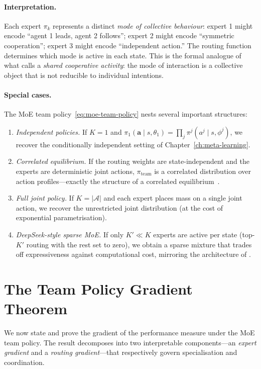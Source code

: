 \paragraph{Interpretation.} Each expert $\pi_k$ represents a distinct \emph{mode of collective behaviour}: expert 1 might encode ``agent 1 leads, agent 2 follows''; expert 2 might encode ``symmetric cooperation''; expert 3 might encode ``independent action.'' The routing function determines which mode is active in each state. This is the formal analogue of what \cite{bratman1993} calls a \emph{shared cooperative activity}: the mode of interaction is a collective object that is not reducible to individual intentions.

\paragraph{Special cases.} The MoE team policy~\eqref{eq:moe-team-policy} nests several important structures:
\begin{enumerate}[label=(\alph*)]
  \item \emph{Independent policies.} If $K=1$ and $\pi_1(\bm{a}\mid s,\theta_1)=\prod_j\pi^j(a^j\mid s,\phi^j)$, we recover the conditionally independent setting of Chapter~\ref{ch:meta-learning}.
  \item \emph{Correlated equilibrium.} If the routing weights are state-independent and the experts are deterministic joint actions, $\pi_{\mathrm{team}}$ is a correlated distribution over action profiles---exactly the structure of a correlated equilibrium~\cite{aumann1974}.
  \item \emph{Full joint policy.} If $K=|\bm{\mathcal{A}}|$ and each expert places mass on a single joint action, we recover the unrestricted joint distribution (at the cost of exponential parametrisation).
  \item \emph{DeepSeek-style sparse MoE.} If only $K'\ll K$ experts are active per state (top-$K'$ routing with the rest set to zero), we obtain a sparse mixture that trades off expressiveness against computational cost, mirroring the architecture of \cite{deepseekv3}.
\end{enumerate}

\section{The Team Policy Gradient Theorem}
\label{sec:team-pgt}

We now state and prove the gradient of the performance measure under the MoE team policy. The result decomposes into two interpretable components---an \emph{expert gradient} and a \emph{routing gradient}---that respectively govern specialisation and coordination.

